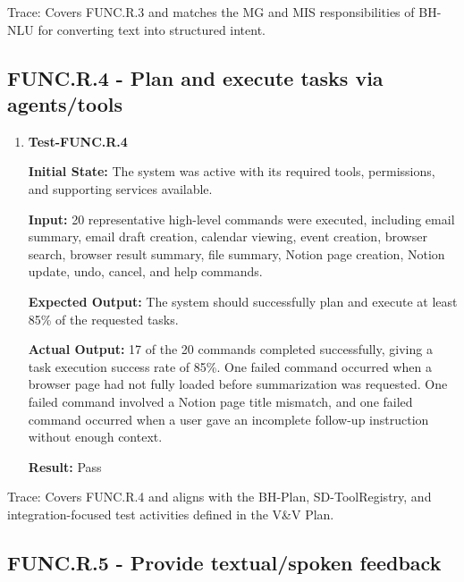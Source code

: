 \documentclass[12pt]{article}
\begin{document}
\noindent Trace: Covers FUNC.R.3 and matches the MG and MIS responsibilities of
BH-NLU for converting text into structured intent.


\subsection{FUNC.R.4 - Plan and execute tasks via agents/tools}

\begin{enumerate}
    \item \textbf{Test-FUNC.R.4}
    
    \textbf{Initial State:} The system was active with its required
    tools, permissions, and supporting services available.
    
    \textbf{Input:} 20 representative high-level commands were
    executed, including email summary, email draft creation, calendar
    viewing, event creation, browser search, browser result summary,
    file summary, Notion page creation, Notion update, undo, cancel,
    and help commands.
    
    \textbf{Expected Output:} The system should successfully plan and
    execute at least 85\% of the requested tasks.
    
    \textbf{Actual Output:} 17 of the 20 commands completed
    successfully, giving a task execution success rate of 85\%. One
    failed command occurred when a browser page had not fully loaded
    before summarization was requested. One failed command involved a
    Notion page title mismatch, and one failed command occurred when a
    user gave an incomplete follow-up instruction without enough
    context.
    
    \textbf{Result:} Pass
\end{enumerate}

\noindent Trace: Covers FUNC.R.4 and aligns with the BH-Plan, SD-ToolRegistry,
and integration-focused test activities defined in the V\&V Plan.


\subsection{FUNC.R.5 - Provide textual/spoken feedback}
\end{document}
